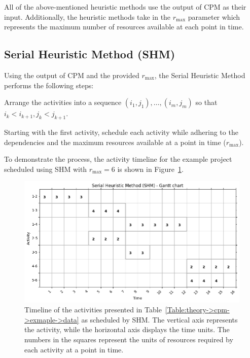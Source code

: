 All of the above-mentioned heuristic methods use the output of CPM as their input.
Additionally, the heuristic methods take in the $r_\mathrm{max}$ parameter which represents the maximum number of resources available at each point in time.



\subsection{Serial Heuristic Method (SHM)}
Using the output of CPM and the provided $r_\mathrm{max}$, the Serial Heuristic Method performs the following steps:

\begin{tight_enumerate}
	\item Arrange the activities into a sequence $\left(i_1, j_1\right),  \ldots, \left(i_m, j_m\right)$ so that $i_k < i_{k+1}, j_k < j_{k+1}$.
	\item Starting with the first activity, schedule each activity while adhering to the dependencies and the maximum resources available at a point in time ($r_\mathrm{max}$).
\end{tight_enumerate}

To demonstrate the process, the activity timeline for the example project scheduled using SHM with $r_\mathrm{max} = 6$ is shown in Figure~\ref{Figure:theory->shm->example->timeline}.

\begin{figure}[ht!]
	\centering
	\includegraphics[width=\linewidth]{images/shm_example_project.png}
	\caption{Timeline of the activities presented in Table~\ref{Table:theory->cpm->exmaple->data} as scheduled by SHM.
		The vertical axis represents the activity, while the horizontal axis displays the time units.
		The numbers in the squares represent the units of resources required by each activity at a point in time.
	}
	\label{Figure:theory->shm->example->timeline}
\end{figure}

